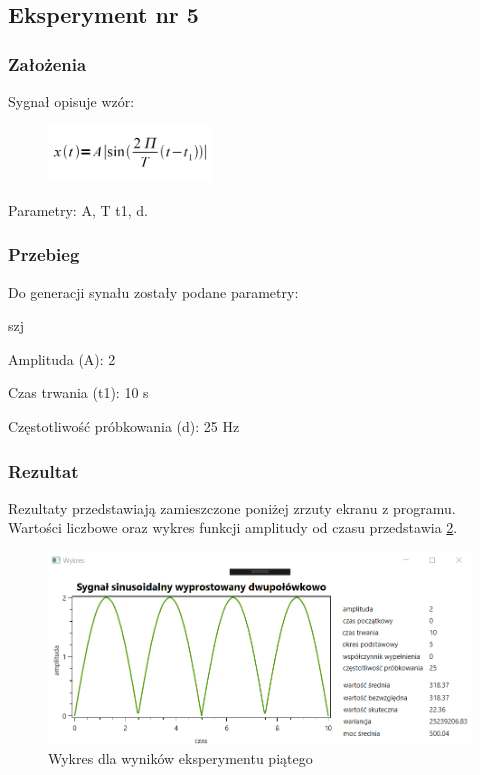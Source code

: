 \documentclass[12pt]{article}
\begin{document}
\subsection{Eksperyment nr 5}

\subsubsection{Założenia}
Sygnał opisuje wzór:
\begin{figure}[h!]
 \centering
 \includegraphics[width=4.3cm]{SinDwuPWzor.PNG}
 \vspace{-0.3cm}
 \label{gw}
\end{figure}
\newpage
Parametry: A, T t1, d.

\subsubsection{Przebieg}
Do generacji synału zostały podane parametry:

\begin{labeling}{szj}
\item [Amplituda (A):] 2
\item [Czas trwania (t1):] 10 s
\item [Częstotliwość próbkowania (d): ] 25 Hz
\end{labeling}

\subsubsection{Rezultat}
Rezultaty przedstawiają zamieszczone poniżej zrzuty ekranu z programu. Wartości liczbowe oraz wykres funkcji amplitudy od czasu przedstawia \ref{Wykres dla wyników eksperymentu piątego}.
\begin{figure}[h!]
 \centering
 \includegraphics[width=12.3cm]{SinDwuP.PNG}
 \vspace{-0.3cm}
 \caption{Wykres dla wyników eksperymentu piątego}
 \label{Wykres dla wyników eksperymentu piątego}
\end{figure}
\end{document}
